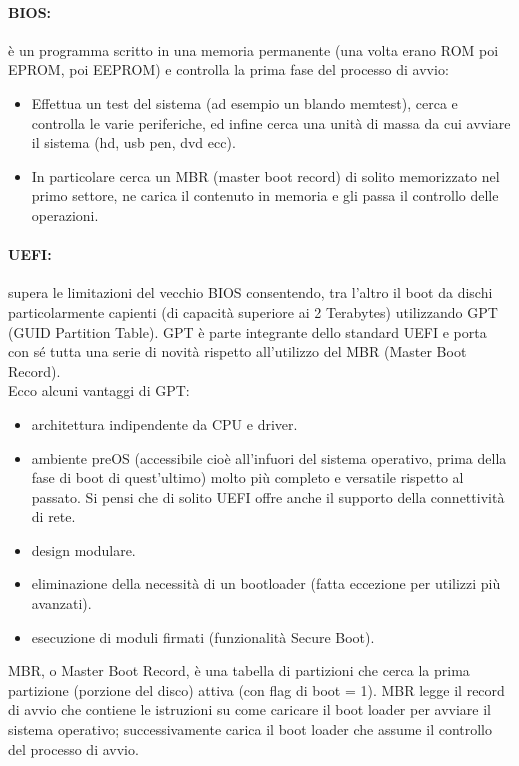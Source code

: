 \documentclass[a4paper]{report}
\begin{document}
\paragraph{BIOS:} è un programma scritto in una memoria
permanente (una volta erano ROM poi EPROM, poi
EEPROM) e controlla la prima fase del processo di
avvio:
\begin{itemize}
\item Effettua un test del sistema (ad esempio un blando
memtest), cerca e controlla le varie periferiche, ed
infine cerca una unità di massa da cui avviare il
sistema (hd, usb pen, dvd ecc).
\item In particolare cerca un MBR (master boot record) di
solito memorizzato nel primo settore, ne carica il
contenuto in memoria e gli passa il controllo delle
operazioni.
\end{itemize}
\paragraph{UEFI:} supera le limitazioni del vecchio BIOS consentendo, tra l'altro il boot da dischi particolarmente capienti (di capacità superiore ai 2 Terabytes) utilizzando GPT (GUID Partition Table). GPT è parte integrante dello standard
UEFI e porta con sé tutta una serie di novità rispetto all'utilizzo del MBR
(Master Boot Record).\\
Ecco alcuni vantaggi di GPT:
\begin{itemize}
\item architettura indipendente da CPU e driver.
\item ambiente preOS (accessibile cioè all'infuori del sistema operativo, prima della fase di
boot di quest'ultimo) molto più completo e versatile rispetto al passato. Si pensi che di
solito UEFI offre anche il supporto della connettività di rete.
\item design modulare.
\item eliminazione della necessità di un bootloader (fatta eccezione per utilizzi più avanzati).
\item esecuzione di moduli firmati (funzionalità Secure Boot).
\end{itemize}
MBR, o Master Boot Record, è una tabella di partizioni che cerca la prima partizione (porzione del disco) attiva (con flag di boot = 1). MBR legge il record di avvio che contiene le istruzioni su come caricare il boot loader per avviare il sistema operativo; successivamente carica il boot loader che assume il controllo del processo di avvio.\\
\end{document}
